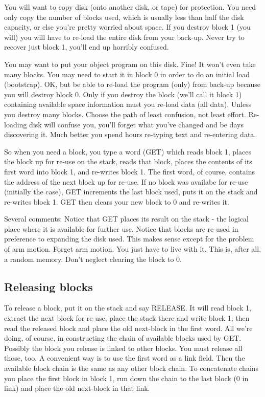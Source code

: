 \documentclass[b5paper, oneside]{book}
\begin{document}
You will want to copy disk (onto another disk, or tape) for protection. You need only copy the number of blocks used, which is usually less than half the disk capacity, or else you're pretty worried about space. If you destroy block 1 (you will) you will have to re-load the entire disk from your back-up. Never try to recover just block 1, you'll end up horribly confused.

You may want to put your object program on this disk. Fine! It won't even take many blocks. You may need to start it in block 0 in order to do an initial load (bootstrap). OK, but be able to re-load the program (only) from back-up because you will destroy block 0. Only if you destroy the block (we'll call it block 1) containing available space information must you re-load data (all data). Unless you destroy many blocks. Choose the path of least confusion, not least effort. Re-loading disk will confuse you, you'll forget what you've changed and be days discovering it. Much better you spend hours re-typing text and re-entering data.

So when you need a block, you type a word (GET) which reads block 1, places the block up for re-use on the stack, reads that block, places the contents of its first word into block 1, and re-writes block 1. The first word, of course, contains the address of the next block up for re-use. If no block was availabe for re-use (initially the case), GET increments the last block used, puts it on the stack and re-writes block 1. GET then clears your new block to 0 and re-writes it.


Several comments: Notice that GET places its result on the stack - the logical place where it is available for further use. Notice that blocks are re-used in preference to expanding the disk used. This makes sense except for the problem of arm motion. Forget arm motion. You just have to live with it. This is, after all, a random memory. Don't neglect clearing the block to 0.

\subsection{Releasing blocks}
To release a block, put it on the stack and say RELEASE. It will read block 1, extract the next block for re-use, place the stack there and write block 1; then read the released block and place the old next-block in the first word. All we're doing, of course, in constructing the chain of available blocks used by GET. Possibly the block you release is linked to other blocks. You must release all those, too. A convenient way is to use the first word as a link field. Then the available block chain is the same as any other block chain. To concatenate chains you place the first block in block 1, run down the chain to the last block (0 in link) and place the old next-block in that link.
\end{document}
